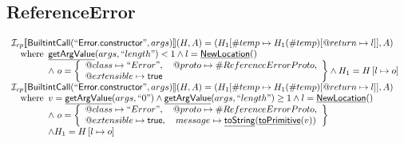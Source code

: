 \documentclass{article}
\makeatletter
\newcommand{\SF}[1]{\mbox{\textsf{#1}}}
\newcommand{\wherec}[1]{{\rm where}\begin{array}[t]{l}#1\end{array}}
\newcommand{\I}{\mathcal{I}}
\newcommand{\set}[1]{\left\{\begin{array}{l}#1\end{array}\right\}}
\newcommand{\lbr}{\llbracket}
\newcommand{\rbr}{\rrbracket}
\newcommand{\hf}[1]{\underline{\sf #1}}
\newcommand{\varprop}[1]{@#1}
\newcommand{\vtrue}{\SF{true}}
\makeatother
\begin{document}
\subsection{ReferenceError}
\[
\begin{array}{l}
\I _{cp}\lbr \SF{BuiltintCall}(``\SF{Error.constructor}",args)\rbr(H,A)
  = (H_1[\#temp \mapsto H_1(\#temp)[@return \mapsto l]], A)\\
\quad\wherec{
  \hf{getArgValue}(args, ``length") < 1 
  \land l=\hf{NewLocation}()\\
  \land\ o = \set{
    \varprop{class}\mapsto ``Error", \quad
    \varprop{proto}\mapsto \#ReferenceErrorProto,\\
    \varprop{extensible}\mapsto \vtrue
    }
  \land H_1=H\left[l\mapsto o\right]\\
  }\\
  
\I _{cp}\lbr \SF{BuiltintCall}(``\SF{Error.constructor}",args)\rbr(H,A)
  = (H_1[\#temp \mapsto H_1(\#temp)[@return \mapsto l]], A)\\
\quad\wherec{
  v = \hf{getArgValue}(args, ``0") \land \hf{getArgValue}(args, ``length") \geq 1
  \land l=\hf{NewLocation}()\\
  \land\ o = \set{
    \varprop{class}\mapsto ``Error", \quad
    \varprop{proto}\mapsto \#ReferenceErrorProto,\\
    \varprop{extensible}\mapsto \vtrue,  \quad
    message \mapsto \hf{toString}(\hf{toPrimitive}(v)) 
    }\\
  \land H_1=H\left[l\mapsto o\right]
  }\\

\end{array}
\]
\end{document}
